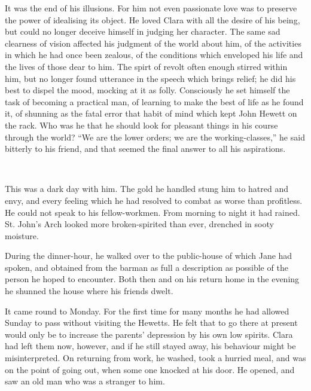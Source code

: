 It was the end of his illusions. For him not even passionate love was to
preserve the power of idealising its object. He loved Clara with all the
desire of his being, but could no longer deceive himself in judging her
character. The same sad clearness of vision affected his judgment of the
world about him, of the activities in which he had once been zealous, of
the conditions which enveloped his life and the lives of those dear to
him. The spirt of revolt often enough stirred within him, but no longer
found utterance in the speech which brings relief; he did his best to
dispel the mood, mocking at it as folly. Consciously he set himself the
task of becoming a practical man, of learning to make the best of life
as he found it, of shunning as the fatal error that habit of mind which
kept John Hewett on the rack. Who was he that he should look for
pleasant things in his course through the world? ``We are the lower
orders; we are the working-classes,'' he said {}bitterly to his friend,
and that seemed the final answer to all his aspirations.

~

This was a dark day with him. The gold he handled stung him to hatred
and envy, and every feeling which he had resolved to combat as worse
than profitless. He could not speak to his fellow-workmen. From morning
to night it had rained. St. John's Arch looked more broken-spirited than
ever, drenched in sooty moisture.

During the dinner-hour, he walked over to the public-house of which Jane
had spoken, and obtained from the barman as full a description as
possible of the person he hoped to encounter. Both then and on his
return home in the evening he shunned the house where his friends dwelt.

It came round to Monday. For the first time for many months he had
allowed Sunday to pass without visiting the Hewetts. He felt that to go
there at present would only be to increase the parents' depression by
his own low spirits. Clara had left them now, {}however, and if he still
stayed away, his behaviour might be misinterpreted. On returning from
work, he washed, took a hurried meal, and was on the point of going out,
when some one knocked at his door. He opened, and saw an old man who was
a stranger to him.
